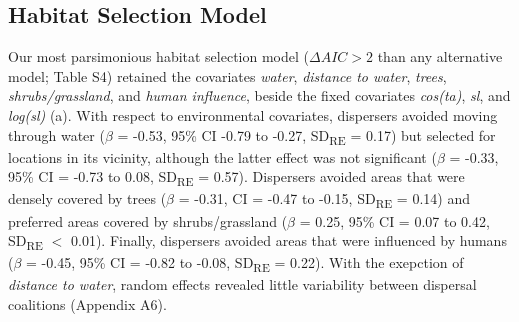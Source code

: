 \documentclass[abstract=on,10pt,a4paper,bibliography=totocnumbered]{article}
\begin{document}
\subsection{Habitat Selection Model}
Our most parsimonious habitat selection model (\(\Delta AIC > 2\) than any
alternative model; Table S4) retained the covariates \textit{water},
\textit{distance to water}, \textit{trees}, \textit{shrubs/grassland}, and
\textit{human influence}, beside the fixed covariates \textit{cos(ta)},
\textit{sl}, and \textit{log(sl)} (a). With respect to
environmental covariates, dispersers avoided moving through water (\(\beta\) =
-0.53, 95\% CI -0.79 to -0.27, SD\textsubscript{RE} = 0.17) but selected for
locations in its vicinity, although the latter effect was not significant
(\(\beta\) = -0.33, 95\% CI = -0.73 to 0.08, SD\textsubscript{RE} = 0.57).
Dispersers avoided areas that were densely covered by trees (\(\beta\) = -0.31,
CI = -0.47 to -0.15, SD\textsubscript{RE} = 0.14) and preferred areas covered by
shrubs/grassland (\(\beta\) = 0.25, 95\% CI = 0.07 to 0.42, SD\textsubscript{RE}
\(<\) 0.01). Finally, dispersers avoided areas that were influenced by humans
(\(\beta\) = -0.45, 95\% CI = -0.82 to -0.08, SD\textsubscript{RE} = 0.22). With
the exepction of \textit{distance to water}, random effects revealed little
variability between dispersal coalitions (Appendix A6).

\end{document}
